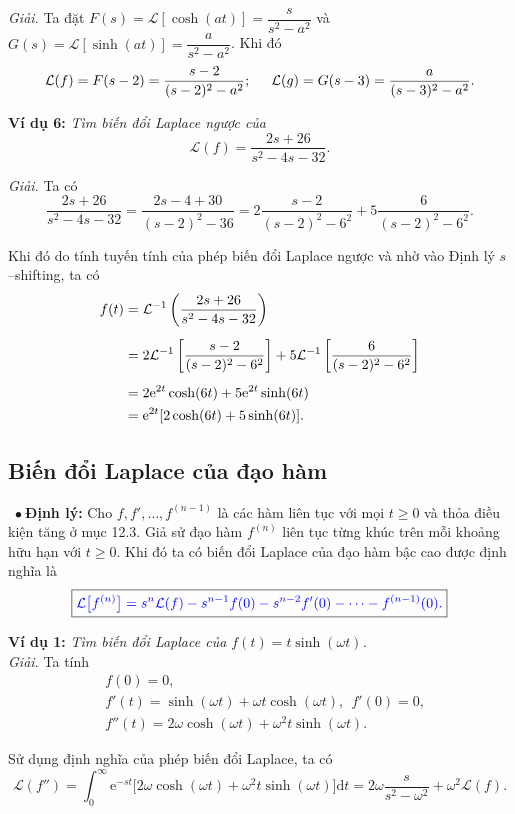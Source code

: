 \documentclass[10pt, a4paper]{article}
\begin{document}
	\textit{Giải.} Ta đặt $F(s)=\mathcal L[\cosh(at)]=\dfrac{s}{s^2-a^2}$ và $G(s)=\mathcal L[\sinh(at)]=\dfrac{a}{s^2-a^2}$. Khi đó $$\mathcal L(f)=F(s-2)=\frac{s-2}{(s-2)^2-a^2};\hspace{0.5cm}\mathcal L(g)=G(s-3)=\dfrac{a}{(s-3)^2-a^2}.$$
	
	\textbf{Ví dụ 6:} \textit{Tìm biến đổi Laplace ngược của} $$\mathcal L(f)=\frac{2s+26}{s^2-4s-32}.$$
	
	\textit{Giải.} Ta có $$\frac{2s+26}{s^2-4s-32}=\frac{2s-4+30}{(s-2)^2-36}=2\frac{s-2}{(s-2)^2-6^2}+5\frac{6}{(s-2)^2-6^2}.$$
	
	Khi đó do tính tuyến tính của phép biến đổi Laplace ngược và nhờ vào Định lý $s$--shifting, ta có \begin{align*}
		f(t)&=\mathcal L^{-1}\left(\frac{2s+26}{s^2-4s-32}\right)\\
		\noalign{\vskip5pt}
		&=2\mathcal L^{-1}\left[\frac{s-2}{(s-2)^2-6^2}\right]+5\mathcal L^{-1}\left[\frac{6}{(s-2)^2-6^2}\right]\\
		\noalign{\vskip5pt}
		&=2\mathrm e^{2t}\cosh(6t)+5\mathrm e^{2t}\sinh(6t)\\
		&=\mathrm e^{2t}[2\cosh(6t)+5\sinh(6t)].
	\end{align*}
	\subsection{Biến đổi Laplace của đạo hàm}
	\quad\,\,\,$\bullet~$\textbf{Định lý:} Cho $f,f',\ldots,f^{(n-1)}$ là các hàm liên tục với mọi $t\ge0$ và thỏa điều kiện tăng ở mục 12.3. Giả sử đạo hàm $f^{(n)}$ liên tục từng khúc trên mỗi khoảng hữu hạn với $t\ge0$. Khi đó ta có biến đổi Laplace của đạo hàm bậc cao được định nghĩa là $$\boxed{\color{blue}\mathcal L\big[f^{(n)}\big]=s^n\mathcal L(f)-s^{n-1}f(0)-s^{n-2}f'(0)-\cdots-f^{(n-1)}(0).}$$
	
	\textbf{Ví dụ 1:} \textit{Tìm biến đổi Laplace của $f(t)=t\sinh(\omega t)$.}\\
	
	\textit{Giải.} Ta tính \begin{align*}
		&f(0)=0,\\
		&f'(t)=\sinh(\omega t)+\omega t\cosh(\omega t),~~f'(0)=0,\\
		&f''(t)=2\omega\cosh(\omega t)+\omega^2t\sinh(\omega t).
	\end{align*}
	
	Sử dụng định nghĩa của phép biến đổi Laplace, ta có $$\mathcal L(f'')=\int_0^\infty\mathrm e^{-st}\big[2\omega\cosh(\omega t)+\omega^2t\sinh(\omega t)\big]\mathrm dt=2\omega\frac{s}{s^2-\omega^2}+\omega^2\mathcal L(f).$$
	
\end{document}
